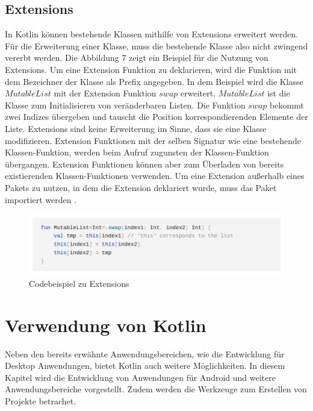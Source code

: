 \documentclass{article}
\begin{document}
\subsection{Extensions}
In Kotlin können bestehende Klassen mithilfe von Extensions erweitert werden. Für die Erweiterung einer Klasse, muss die bestehende Klasse also nicht zwingend vererbt werden. Die Abbildung 7 zeigt ein Beispiel für die Nutzung von Extensions.  Um eine Extension Funktion zu deklarieren, wird die Funktion mit dem Bezeichner der Klasse als Prefix angegeben. In dem Beispiel wird die Klasse $MutableList$ mit der Extension Funktion $swap$ erweitert. $MutableList$ ist die Klasse zum Initialisieren von veränderbaren Listen. Die Funktion $swap$ bekommt zwei Indizes übergeben und tauscht die Position korrespondierenden Elemente der Liste. \newline
Extensions sind keine Erweiterung im Sinne, dass sie eine Klasse modifizieren. Extension Funktionen mit der selben Signatur wie eine bestehende Klassen-Funktion, werden beim Aufruf zugunsten der Klassen-Funktion übergangen. Extension Funktionen können aber zum Überladen von bereits existierenden Klassen-Funktionen verwenden. Um eine Extension außerhalb eines Pakets zu nutzen, in dem die Extension deklariert wurde, muss das Paket importiert werden \cite{KotlinLangDocExtensions}.
\begin{figure}[!htb]
    \centering
    \includegraphics[width=\columnwidth]{img/Extensions.png}
    \caption{Codebeispiel zu Extensions\footnotemark}
\end{figure}

\section{Verwendung von Kotlin}
Neben den bereits erwähnte Anwendungsbereichen, wie die Entwicklung für Desktop Anwendungen, bietet Kotlin auch weitere Möglichkeiten. In diesem Kapitel wird die Entwicklung von Anwendungen für Android und weitere Anwendungsbereiche vorgestellt. Zudem werden die Werkzeuge zum Erstellen von Projekte betrachet.
\end{document}
